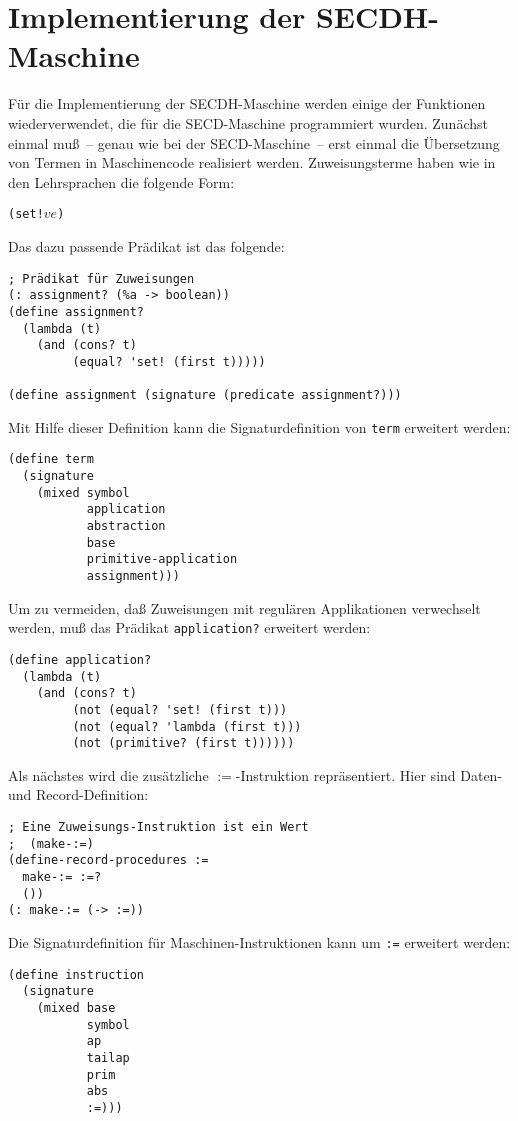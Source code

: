 \section{Implementierung der SECDH-Maschine}


Für die Implementierung der SECDH-Maschine werden einige der
Funktionen wiederverwendet, die für die SECD-Maschine programmiert
wurden.  Zunächst einmal muß~-- genau wie bei der SECD-Maschine~--
erst einmal die Übersetzung von Termen in Maschinencode realisiert
werden.  Zuweisungsterme haben wie in den Lehrsprachen die folgende Form:
%
\begin{alltt}
(set! \(v\) \(e\))
\end{alltt}
%
Das dazu passende Prädikat ist das folgende:
%
\begin{verbatim}
; Prädikat für Zuweisungen
(: assignment? (%a -> boolean))
(define assignment?
  (lambda (t)
    (and (cons? t)
         (equal? 'set! (first t)))))

(define assignment (signature (predicate assignment?)))
\end{verbatim}
%
Mit Hilfe dieser Definition kann die Signaturdefinition von
\texttt{term} erweitert werden:
%
\begin{verbatim}
(define term
  (signature
    (mixed symbol
           application
           abstraction
           base
           primitive-application
           assignment)))
\end{verbatim}
%
Um zu vermeiden, daß Zuweisungen mit regulären Applikationen
verwechselt werden, muß das Prädikat \texttt{application?} erweitert
werden:
%
\begin{verbatim}
(define application?
  (lambda (t)
    (and (cons? t)
         (not (equal? 'set! (first t)))
         (not (equal? 'lambda (first t)))
         (not (primitive? (first t))))))
\end{verbatim}
%
Als nächstes wird die zusätzliche $\mathtt{:=}$-Instruktion
repräsentiert.  Hier sind Daten- und Record-Definition:
%
\begin{verbatim}
; Eine Zuweisungs-Instruktion ist ein Wert
;  (make-:=)
(define-record-procedures :=
  make-:= :=?
  ())
(: make-:= (-> :=))
\end{verbatim}
%
Die Signaturdefinition für Maschinen-Instruktionen kann um \texttt{:=}
erweitert werden:
%
\begin{verbatim}
(define instruction
  (signature
    (mixed base
           symbol
           ap
           tailap
           prim
           abs
           :=)))
\end{verbatim}

